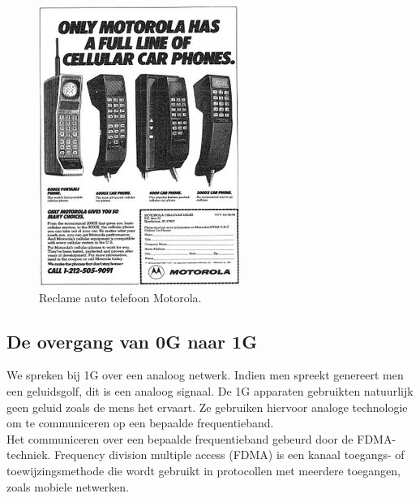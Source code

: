 \documentclass{article}
\begin{document}
\begin{figure}[H]
\centering
\includegraphics[width=0.85 \textwidth]{img/Moto.jpg}
\caption{Reclame auto telefoon Motorola.}
\label{fig:Moto}
\end{figure}

\subsection{De overgang van 0G naar 1G} \label{ssec: overgang}

\noindent We spreken bij 1G over een analoog netwerk. Indien men spreekt genereert men een geluidsgolf, dit is een analoog signaal. De 1G apparaten gebruikten natuurlijk geen geluid zoals de mens het ervaart. Ze gebruiken hiervoor analoge technologie om te communiceren op een bepaalde frequentieband. \\

\noindent Het communiceren over een bepaalde frequentieband gebeurd door de FDMA-techniek. Frequency division multiple access (FDMA) is een kanaal toegangs- of toewijzingsmethode die wordt gebruikt in protocollen met meerdere toegangen, zoals mobiele netwerken.\\
\end{document}
